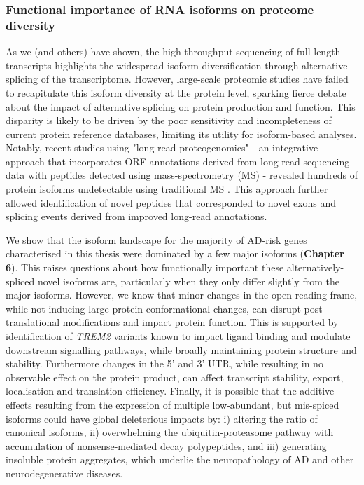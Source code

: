 \subsubsection{Functional importance of RNA isoforms on proteome diversity} 
As we (and others) have shown, the high-throughput sequencing of full-length transcripts highlights the widespread isoform diversification through alternative splicing of the transcriptome. However, large-scale proteomic studies have failed to recapitulate this isoform diversity at the protein level, sparking fierce debate about the impact of alternative splicing on protein production and function\cite{Tress2017a,Blencowe2017,Tress2017b}. This disparity is likely to be driven by the poor sensitivity and incompleteness of current protein reference databases, limiting its utility for isoform-based analyses\cite{Reixachs-Sole2022}. Notably, recent studies using "long-read proteogenomics" - an integrative approach that incorporates ORF annotations derived from long-read sequencing data with peptides detected using mass-spectrometry (MS) - revealed hundreds of protein isoforms undetectable using traditional MS \cite{Miller2022,Wang2019a}. This approach further allowed identification of novel peptides that corresponded to novel exons and splicing events derived from improved long-read annotations\cite{Miller2022,KayLeung2021}.  

We show that the isoform landscape for the majority of AD-risk genes characterised in this thesis were dominated by a few major isoforms (\textbf{Chapter 6}). This raises questions about how functionally important these alternatively-spliced novel isoforms are, particularly when they only differ slightly from the major isoforms. However, we know that minor changes in the open reading frame, while not inducing large protein conformational changes, can disrupt post-translational modifications and impact protein function\cite{Reixachs-Sole2022}. This is supported by identification of \textit{TREM2} variants known to impact ligand binding and modulate downstream signalling pathways, while broadly maintaining protein structure and stability\cite{Kober2016}. Furthermore changes in the 5' and 3' UTR, while resulting in no observable effect on the protein product, can affect transcript stability, export, localisation and translation efficiency\cite{Reixachs-Sole2022}. Finally, it is possible that the additive effects resulting from the expression of multiple low-abundant, but mis-spiced isoforms could have global deleterious impacts by: i) altering the ratio of canonical isoforms, ii) overwhelming the ubiquitin-proteasome pathway with accumulation of nonsense-mediated decay polypeptides, and iii) generating insoluble protein aggregates, which underlie the neuropathology of AD and other neurodegenerative diseases.

